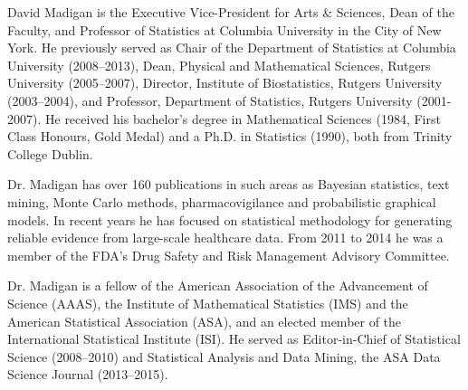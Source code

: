 \hrulefill

\small David Madigan is the Executive Vice-President for Arts \& Sciences,
Dean of the Faculty, and Professor of Statistics at Columbia
University in the City of New York. He previously served as Chair of
the Department of Statistics at Columbia University (2008--2013), Dean,
Physical and Mathematical Sciences, Rutgers University (2005--2007),
Director, Institute of Biostatistics, Rutgers University (2003--2004),
and Professor, Department of Statistics, Rutgers University
(2001-2007).  He received his bachelor's degree in Mathematical
Sciences (1984, First Class Honours, Gold Medal) and a Ph.D. in
Statistics (1990), both from Trinity College Dublin.

Dr. Madigan has over 160 publications in such areas as Bayesian statistics,
text mining, Monte Carlo methods, pharmacovigilance and probabilistic
graphical models. In recent years he has focused on statistical
methodology for generating reliable evidence from large-scale
healthcare data. From 2011 to 2014 he was a member of the FDA's
Drug Safety and Risk Management Advisory Committee.

Dr. Madigan is a fellow of the American Association of the Advancement
of Science (AAAS), the Institute of Mathematical Statistics (IMS) and
the American Statistical Association (ASA), and an elected member of
the International Statistical Institute (ISI).  He served as
Editor-in-Chief of Statistical Science (2008--2010) and Statistical
Analysis and Data Mining, the ASA Data Science Journal (2013--2015).

\normalsize

